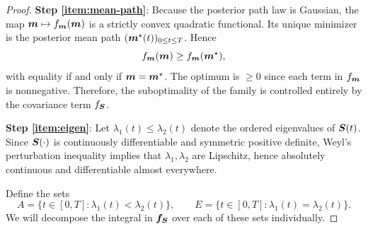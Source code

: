 \begin{proof}
\textbf{Step \ref{item:mean-path}}:
Because the posterior path law is Gaussian, the map $\boldsymbol{m} \mapsto f_{\boldsymbol{m}}(\boldsymbol{m})$ is a strictly convex quadratic functional. 
Its unique minimizer is the posterior mean path $(\boldsymbol{m}^\star(t))_{0 \leq t \leq T}$. 
Hence
\begin{equation*}
    f_{\boldsymbol{m}}(\boldsymbol{m}) \geq f_{\boldsymbol{m}}(\boldsymbol{m}^\star),
\end{equation*}
with equality if and only if $\boldsymbol{m}=\boldsymbol{m}^\star$. 
The optimum is $\geq 0$ since each term in $f_{\boldsymbol{m}}$ is nonnegative.
Therefore, the suboptimality of the family is controlled entirely by the covariance term $f_{\boldsymbol{S}}$.

\textbf{Step \ref{item:eigen}}: 
Let $\lambda_1(t) \leq \lambda_2(t)$ denote the ordered eigenvalues of $\boldsymbol{S}(t)$. 
Since $\boldsymbol{S}(\cdot)$ is continuously differentiable and symmetric positive definite, Weyl's perturbation inequality implies that $\lambda_1,\lambda_2$ are Lipschitz, hence absolutely continuous and differentiable almost everywhere.

Define the sets
\begin{equation*}
    A =\{t \in [0,T] : \lambda_1(t) < \lambda_2(t)\},
    \qquad
    E =\{t \in [0,T] : \lambda_1(t)=\lambda_2(t)\}.
\end{equation*}
We will decompose the integral in $\boldsymbol{f}_{\boldsymbol{S}}$ over each of these sets individually.


\end{proof}
